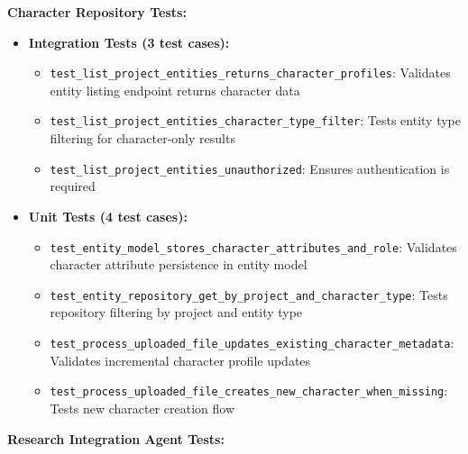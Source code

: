 \textbf{Character Repository Tests:}

\begin{itemize}
    \item \textbf{Integration Tests (3 test cases):}
    \begin{itemize}
        \item \texttt{test\_list\_project\_entities\_returns\_character\_profiles}: Validates entity listing endpoint returns character data
        \item \texttt{test\_list\_project\_entities\_character\_type\_filter}: Tests entity type filtering for character-only results
        \item \texttt{test\_list\_project\_entities\_unauthorized}: Ensures authentication is required
    \end{itemize}
    \item \textbf{Unit Tests (4 test cases):}
    \begin{itemize}
        \item \texttt{test\_entity\_model\_stores\_character\_attributes\_and\_role}: Validates character attribute persistence in entity model
        \item \texttt{test\_entity\_repository\_get\_by\_project\_and\_character\_type}: Tests repository filtering by project and entity type
        \item \texttt{test\_process\_uploaded\_file\_updates\_existing\_character\_metadata}: Validates incremental character profile updates
        \item \texttt{test\_process\_uploaded\_file\_creates\_new\_character\_when\_missing}: Tests new character creation flow
    \end{itemize}
\end{itemize}

\textbf{Research Integration Agent Tests:}

